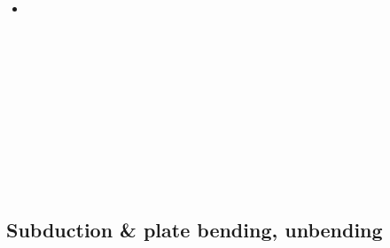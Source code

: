 \begin{scriptsize}
\begin{itemize}
\textcite{suky21} \\
\textcite{befd21} \\
\textcite{chcg21} \\
\textcite{kifc21} \\
\textcite{zhle21} \\
\textcite{bafu21} \\
\textcite{kekg21} \\
\textcite{enma21} \\
\textcite{hoco21} \\
\textcite{resr21} \\
\textcite{gupg21b} \\
\textcite{ligl21b} \\
\textcite{gebb21} \\
\textcite{brbf21} \\
\textcite{chri21} \\
\textcite{diha21} \\

\item[\twothousandtwentytwo] 
\textcite{scva22} \\
\textcite{alrr22a} \\
\textcite{alrr22b} \\
\textcite{behb22} \\
\textcite{erhf22} \\
\textcite{yacz22} \\
\textcite{liya22} \\
\textcite{pusk22} \\
\textcite{lala22} \\
\textcite{cesg22} \\
\textcite{vavw22} \\

\end{itemize}
\end{scriptsize}

\subsection{Subduction \& plate bending, unbending}

